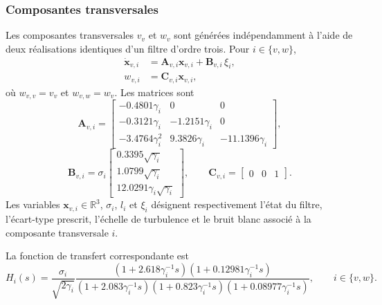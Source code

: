 \documentclass[11pt,a4paper,oneside]{report}
\newcommand{\vect}[1]{\bm{#1}}
\begin{document}
\subsubsection{Composantes transversales}

Les composantes transversales $v_v$ et $w_v$ sont générées indépendamment à l'aide de deux réalisations identiques d'un filtre d'ordre trois. Pour $i\in\{v,w\}$,
\begin{subequations}
	\label{eq_vk_transverse_state_space}
	\begin{align}
		\dot{\vect x}_{v,i}
		&=
		\mathbf A_{v,i}\vect x_{v,i}
		+
		\mathbf B_{v,i}\,\xi_i,
		\\
		w_{v,i}
		&=
		\mathbf C_{v,i}\vect x_{v,i},
	\end{align}
\end{subequations}
où $w_{v,v}=v_v$ et $w_{v,w}=w_v$. Les matrices sont
\begin{equation}
	\mathbf A_{v,i}
	=
	\begin{bmatrix}
		-0.4801\gamma_i & 0 & 0\\
		-0.3121\gamma_i & -1.2151\gamma_i & 0\\
		-3.4764\gamma_i^2 & 9.3826\gamma_i & -11.1396\gamma_i
	\end{bmatrix},
	\label{eq_vk_transverse_state_matrix}
\end{equation}
\begin{equation}
	\mathbf B_{v,i}
	=
	\sigma_i
	\begin{bmatrix}
		0.3395\sqrt{\gamma_i}\\
		1.0799\sqrt{\gamma_i}\\
		12.0291\gamma_i\sqrt{\gamma_i}
	\end{bmatrix},
	\qquad
	\mathbf C_{v,i}
	=
	\begin{bmatrix}
		0 & 0 & 1
	\end{bmatrix}.
	\label{eq_vk_transverse_input_output_matrices}
\end{equation}
Les variables $\vect x_{v,i}\in\mathbb{R}^3$, $\sigma_i$, $l_i$ et $\xi_i$ désignent respectivement l'état du filtre, l'écart-type prescrit, l'échelle de turbulence et le bruit blanc associé à la composante transversale $i$.

La fonction de transfert correspondante est
\begin{equation}
	H_i(s)
	=
	\frac{\sigma_i}{\sqrt{2\gamma_i}}
	\frac{
		\left(1+2.618\gamma_i^{-1}s\right)
		\left(1+0.12981\gamma_i^{-1}s\right)
	}{
		\left(1+2.083\gamma_i^{-1}s\right)
		\left(1+0.823\gamma_i^{-1}s\right)
		\left(1+0.08977\gamma_i^{-1}s\right)
	},
	\qquad i\in\{v,w\}.
	\label{eq_vk_transverse_transfer_function}
\end{equation}
\end{document}
